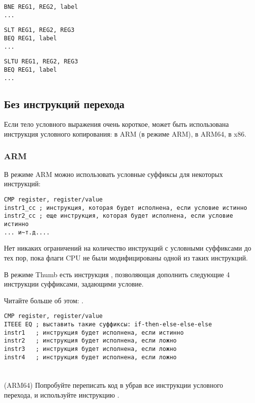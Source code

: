\begin{lstlisting}[caption=Проверка на неравенство]
BNE REG1, REG2, label
...
\end{lstlisting}

\begin{lstlisting}[caption=Проверка на меньше{,} больше (знаковое)]
SLT REG1, REG2, REG3
BEQ REG1, label
...
\end{lstlisting}

\begin{lstlisting}[caption=Проверка на меньше{,} больше (беззнаковое)]
SLTU REG1, REG2, REG3
BEQ REG1, label
...
\end{lstlisting}

\subsection{Без инструкций перехода}


Если тело условного выражения очень короткое, может быть
использована инструкция условного копирования:  в ARM (в режиме ARM),  в ARM64,  в x86.

\subsubsection{ARM}

В режиме ARM можно использовать условные суффиксы для некоторых инструкций:

\begin{lstlisting}[caption=ARM (\ARMMode)]
CMP register, register/value
instr1_cc ; инструкция, которая будет исполнена, если условие истинно
instr2_cc ; еще инструкция, которая будет исполнена, если условие истинно
... и~т.д....
\end{lstlisting}

Нет никаких ограничений на количество инструкций с условными суффиксами до тех пор,
пока флаги CPU не были модифицированы одной из таких инструкций.


В режиме Thumb есть инструкция , позволяющая дополнить следующие 4 инструкции суффиксами, задающими
условие.

Читайте больше об этом: .

\begin{lstlisting}[caption=ARM (\ThumbMode)]
CMP register, register/value
ITEEE EQ ; выставить такие суффиксы: if-then-else-else-else
instr1   ; инструкция будет исполнена, если истинно
instr2   ; инструкция будет исполнена, если ложно
instr3   ; инструкция будет исполнена, если ложно
instr4   ; инструкция будет исполнена, если ложно
\end{lstlisting}

\section{\Exercise}

(ARM64) Попробуйте переписать код в  
убрав все инструкции условного перехода, и используйте инструкцию .

